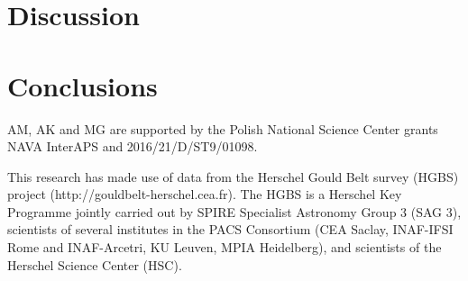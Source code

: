 \documentclass{aa}
\begin{document}
\section{Discussion}





\section{Conclusions}





\begin{acknowledgements}
AM, AK and MG are supported by the Polish National Science Center grants NAVA InterAPS and 2016/21/D/ST9/01098. 

This research has made use of data from the Herschel Gould Belt survey (HGBS) project (http://gouldbelt-herschel.cea.fr). The HGBS is a Herschel Key Programme jointly carried out by SPIRE Specialist Astronomy Group 3 (SAG 3), scientists of several institutes in the PACS Consortium (CEA Saclay, INAF-IFSI Rome and INAF-Arcetri, KU Leuven, MPIA Heidelberg), and scientists of the Herschel Science Center (HSC).
\end{acknowledgements}


%
%
\end{document}
